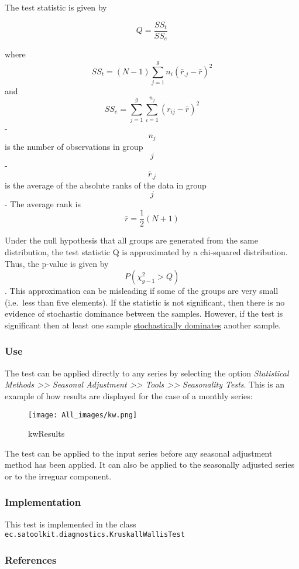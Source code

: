 \documentclass[
]{book}
\begin{document}
The test statistic is given by

\[
Q=\frac{SS_t}{SS_e}
\]

where \[ SS_t=(N-1)\sum_{j=1}^{g}n_i(\bar{r}_{.j}-\bar{r})^2 \] and \[ SS_e=\sum_{j=1}^{g}\sum_{i=1}^{n_j}(r_{ij}-\bar{r})^2 \]
- \[ n_j \] is the number of observations in group \[ j  \]
- \[ \bar{r}_{.j} \] is the average of the absolute ranks of the data in group \[ j  \]
- The average rank is \[ \bar{r} =\frac{1}{2}(N+1) \]

Under the null hypothesis that all groups are generated from the same distribution, the test statistic Q is approximated by a chi-squared distribution.
Thus, the p-value is given by \[ P( \chi^2_{g-1}>Q) \]. This approximation can be misleading if some of the groups are very small (i.e.~less than five elements). If the statistic is not significant, then there is no evidence of stochastic dominance between the samples.
However, if the test is significant then at least one sample \href{http://en.wikipedia.org/wiki/Stochastic_dominance}{stochastically
dominates} another sample.

\hypertarget{use}{%
\subsubsection{Use}\label{use}}

The test can be applied directly to any series by selecting the
option \emph{Statistical Methods \textgreater\textgreater{} Seasonal Adjustment \textgreater\textgreater{} Tools \textgreater\textgreater{} Seasonality Tests}. This is
an example of how results are displayed for the case of a monthly series:

\begin{figure}
\centering
\texttt{[image: All\_images/kw.png]}
\caption{kwResults}
\end{figure}

The test can be applied to the input series before any seasonal adjustment method has been applied. It can also be applied to the seasonally adjusted series or to the irreguar component.

\hypertarget{implementation-1}{%
\subsubsection{Implementation}\label{implementation-1}}

This test is implemented in the class \texttt{ec.satoolkit.diagnostics.KruskallWallisTest}

\hypertarget{references-2}{%
\subsubsection{References}\label{references-2}}
\end{document}

